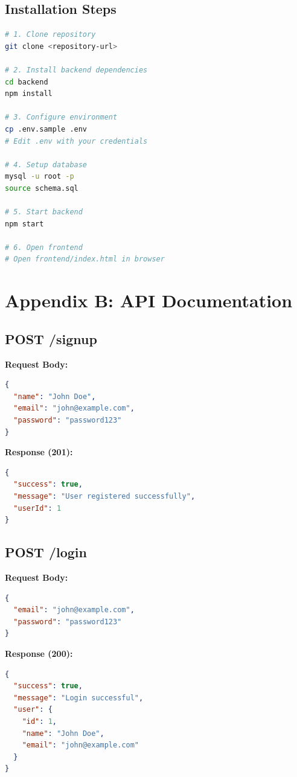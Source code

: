 \documentclass[12pt,a4paper]{article}
\begin{document}
\subsection{Installation Steps}
\begin{lstlisting}[language=bash]
# 1. Clone repository
git clone <repository-url>

# 2. Install backend dependencies
cd backend
npm install

# 3. Configure environment
cp .env.sample .env
# Edit .env with your credentials

# 4. Setup database
mysql -u root -p
source schema.sql

# 5. Start backend
npm start

# 6. Open frontend
# Open frontend/index.html in browser
\end{lstlisting}

\section{Appendix B: API Documentation}

\subsection{POST /signup}
\textbf{Request Body:}
\begin{lstlisting}[language=json]
{
  "name": "John Doe",
  "email": "john@example.com",
  "password": "password123"
}
\end{lstlisting}

\textbf{Response (201):}
\begin{lstlisting}[language=json]
{
  "success": true,
  "message": "User registered successfully",
  "userId": 1
}
\end{lstlisting}

\subsection{POST /login}
\textbf{Request Body:}
\begin{lstlisting}[language=json]
{
  "email": "john@example.com",
  "password": "password123"
}
\end{lstlisting}

\textbf{Response (200):}
\begin{lstlisting}[language=json]
{
  "success": true,
  "message": "Login successful",
  "user": {
    "id": 1,
    "name": "John Doe",
    "email": "john@example.com"
  }
}
\end{lstlisting}
\end{document}
